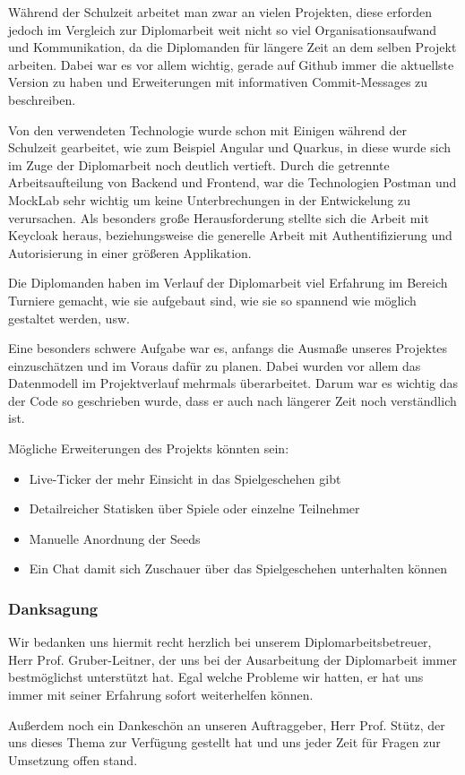 Während der Schulzeit arbeitet man zwar an vielen Projekten,
diese erforden jedoch im Vergleich zur Diplomarbeit weit nicht so viel Organisationsaufwand und Kommunikation, da die Diplomanden
für längere Zeit an dem selben Projekt arbeiten. Dabei war es vor allem wichtig, gerade auf Github immer die aktuellste Version zu haben und Erweiterungen mit
informativen Commit-Messages zu beschreiben. 

Von den verwendeten Technologie wurde schon mit Einigen während der Schulzeit gearbeitet, wie zum Beispiel Angular und Quarkus, in diese wurde sich im Zuge der Diplomarbeit noch deutlich vertieft.
Durch die getrennte Arbeitsaufteilung von Backend und Frontend, war die Technologien Postman und MockLab sehr wichtig um keine Unterbrechungen in der Entwickelung zu verursachen.
Als besonders große Herausforderung stellte sich die Arbeit mit Keycloak heraus, beziehungsweise die generelle Arbeit mit Authentifizierung und Autorisierung in einer größeren Applikation.

Die Diplomanden haben im Verlauf der Diplomarbeit viel Erfahrung im Bereich Turniere gemacht, wie sie aufgebaut sind, wie sie so spannend wie möglich gestaltet werden, 
usw.

Eine besonders schwere Aufgabe war es, anfangs die Ausmaße unseres Projektes einzuschätzen und im Voraus dafür zu planen. Dabei wurden vor allem das Datenmodell im Projektverlauf mehrmals überarbeitet.
Darum war es wichtig das der Code so geschrieben wurde, dass er auch nach längerer Zeit noch verständlich ist.

Mögliche Erweiterungen des Projekts könnten sein:

\begin{itemize}
    \item Live-Ticker der mehr Einsicht in das Spielgeschehen gibt
    \item Detailreicher Statisken über Spiele oder einzelne Teilnehmer
    \item Manuelle Anordnung der Seeds
    \item Ein Chat damit sich Zuschauer über das Spielgeschehen unterhalten können
\end{itemize}


\subsubsection{Danksagung}
Wir bedanken uns hiermit recht herzlich bei unserem Diplomarbeitsbetreuer, Herr Prof. Gruber-Leitner, der uns bei der Ausarbeitung der Diplomarbeit immer bestmöglichst unterstützt hat. Egal welche Probleme wir hatten, er hat uns immer mit seiner Erfahrung sofort weiterhelfen können. 

Außerdem noch ein Dankeschön an unseren Auftraggeber, Herr Prof. Stütz, der uns dieses Thema zur Verfügung gestellt hat und uns jeder Zeit für Fragen zur Umsetzung offen stand.